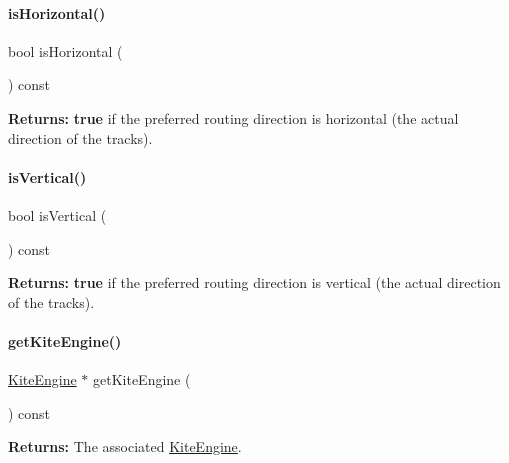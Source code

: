 \paragraph{\texorpdfstring{is\+Horizontal()}{isHorizontal()}}
{\footnotesize\ttfamily bool is\+Horizontal (\begin{DoxyParamCaption}{ }\end{DoxyParamCaption}) const\hspace{0.3cm}{\ttfamily [inline]}}

{\bfseries Returns\+:} {\bfseries true} if the preferred routing direction is horizontal (the actual direction of the tracks). \mbox{\label{classKite_1_1RoutingPlane_abd54544ef1710ee4b67cfb021d73446c}} 
\paragraph{\texorpdfstring{is\+Vertical()}{isVertical()}}
{\footnotesize\ttfamily bool is\+Vertical (\begin{DoxyParamCaption}{ }\end{DoxyParamCaption}) const\hspace{0.3cm}{\ttfamily [inline]}}

{\bfseries Returns\+:} {\bfseries true} if the preferred routing direction is vertical (the actual direction of the tracks). \mbox{\label{classKite_1_1RoutingPlane_af7373bd3a4ee8fcf28a316230ed37fc0}} 
\paragraph{\texorpdfstring{get\+Kite\+Engine()}{getKiteEngine()}}
{\footnotesize\ttfamily \mbox{\hyperlink{classKite_1_1KiteEngine}{Kite\+Engine}} $\ast$ get\+Kite\+Engine (\begin{DoxyParamCaption}{ }\end{DoxyParamCaption}) const\hspace{0.3cm}{\ttfamily [inline]}}

{\bfseries Returns\+:} The associated \mbox{\hyperlink{classKite_1_1KiteEngine}{Kite\+Engine}}. 

